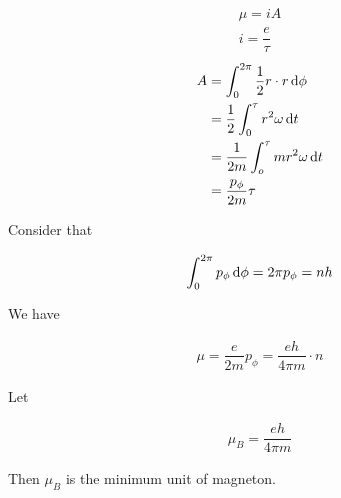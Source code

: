 \begin{equation*}
  \begin{aligned}
    \mu = i A \\
    i = \dfrac{e}{\tau} 
  \end{aligned}
\end{equation*}
\begin{equation*}
  \begin{aligned}
    A &= \int_0^{2 \pi} \dfrac{1}{2} r \cdot r \mathop{}\!\mathrm{d} \phi \\
    &= \dfrac{1}{2} \int_0^{\tau} r^2 \omega \mathop{}\!\mathrm{d} t \\
    &= \dfrac{1}{2 m} \int_o^{\tau} m r^2 \omega \mathop{}\!\mathrm{d} t \\
    &= \dfrac{p_{\phi}}{2 m} \tau 
  \end{aligned}
\end{equation*}

Consider that

\begin{equation*}
  \begin{aligned}
    \int_0^{2\pi} p_{\phi} \mathop{}\!\mathrm{d} \phi = 2\pi p_{\phi} = nh
  \end{aligned}
\end{equation*}

We have

\begin{equation*}
  \begin{aligned}
    \mu = \dfrac{e}{2 m} p_{\phi} = \dfrac{eh}{4 \pi m} \cdot n
  \end{aligned}
\end{equation*}

Let

\begin{equation}
  \begin{aligned}
    \mu_B = \dfrac{eh}{4 \pi m} 
  \end{aligned}
\end{equation}

Then $\mu_B$ is the minimum unit of magneton.

